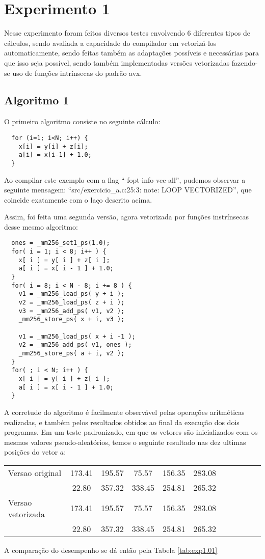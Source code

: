 \documentclass[conference]{IEEEtran}
\begin{document}
\section{Experimento 1}
Nesse experimento foram feitos diversos testes envolvendo 6 diferentes tipos de cálculos, sendo avaliada a capacidade do compilador em vetorizá-los automaticamente, sendo feitas também as adaptações possíveis e necessárias para que isso seja possível, sendo também implementadas versões vetorizadas fazendo-se uso de funções intrínsecas do padrão avx.

\subsection{Algoritmo 1}
O primeiro algoritmo consiste no seguinte cálculo:

\begin{lstlisting}
  for (i=1; i<N; i++) {
    x[i] = y[i] + z[i];
    a[i] = x[i-1] + 1.0;
  }
\end{lstlisting}

Ao compilar este exemplo com a flag ``-fopt-info-vec-all'', pudemos observar a seguinte mensagem: ``src/exercicio\_a.c:25:3: note: LOOP VECTORIZED'', que coincide exatamente com o laço descrito acima.

Assim, foi feita uma segunda versão, agora vetorizada por funções instrínsecas desse mesmo algoritmo:

\begin{lstlisting}
  ones = _mm256_set1_ps(1.0);
  for( i = 1; i < 8; i++ ) {
    x[ i ] = y[ i ] + z[ i ];
    a[ i ] = x[ i - 1 ] + 1.0;
  }
  for( i = 8; i < N - 8; i += 8 ) {
    v1 = _mm256_load_ps( y + i );
    v2 = _mm256_load_ps( z + i );
    v3 = _mm256_add_ps( v1, v2 );
    _mm256_store_ps( x + i, v3 );

    v1 = _mm256_load_ps( x + i -1 );
    v2 = _mm256_add_ps( v1, ones );
    _mm256_store_ps( a + i, v2 );
  }
  for( ; i < N; i++ ) {
    x[ i ] = y[ i ] + z[ i ];
    a[ i ] = x[ i - 1 ] + 1.0;
  }
\end{lstlisting}

A corretude do algoritmo é facilmente observável pelas operações aritméticas realizadas, e também pelos resultados obtidos ao final da execução dos dois programas.
Em um teste padronizado, em que os vetores são inicializados com os mesmos valores pseudo-aleatórios, temos o seguinte resultado nas dez ultimas posições do vetor $a$:

\begin{table}[htb!]
\centering
\begin{tabular}{ l c c c c c c c c c c }
  Versao original & 173.41 & 195.57 & 75.57 & 156.35 & 283.08 \\
  & 22.80 & 357.32 & 338.45 & 254.81 & 265.32\\
  Versao vetorizada & 173.41 & 195.57 & 75.57 & 156.35 & 283.08 \\
  & 22.80 & 357.32 & 338.45 & 254.81 & 265.32\\
\end{tabular}
\end{table}
A comparação do desempenho se dá então pela Tabela \ref{tab:exp1.01}
\end{document}
